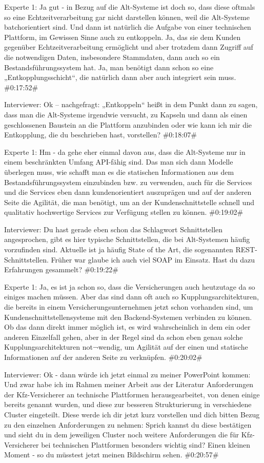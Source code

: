 Experte 1:
Ja gut - in Bezug auf die Alt-Systeme ist doch so, dass diese oftmals so eine Echtzeitverarbeitung gar nicht darstellen können, weil die Alt-Systeme batchorientiert sind. Und dann ist natürlich die Aufgabe von einer technischen Plattform, im Gewissen Sinne auch zu entkoppeln. Ja, das sie dem Kunden gegenüber Echtzeitverarbeitung ermöglicht und aber trotzdem dann Zugriff auf die notwendigen Daten, insbesondere Stammdaten, dann auch so ein Bestandsführungssystem hat. Ja, man benötigt dann schon so eine „Entkopplungsschicht“, die natürlich dann aber auch integriert sein muss.
\#0:17:52\#

Interviewer:
Ok – nachgefragt: „Entkoppeln“ heißt in dem Punkt dann zu sagen, dass man die Alt-Systeme irgendwie versucht, zu Kapseln und dann als einen geschlossenen Baustein an die Plattform anzubinden oder wie kann ich mir die Entkopplung, die du beschrieben hast, vorstellen?
\#0:18:07\#

Experte 1:
Hm - da gehe eher einmal davon aus, dass die Alt-Systeme nur in einem beschränkten Umfang API-fähig sind. Das man sich dann Modelle überlegen muss, wie schafft man es die statischen Informationen aus dem Bestandsführungssystem einzubinden bzw. zu verwenden, auch für die Services und die Services eben dann kundenorientiert auszuprägen und auf der anderen Seite die Agilität, die man benötigt, um an der Kundenschnittstelle schnell und qualitativ hochwertige Services zur Verfügung stellen zu können.
\#0:19:02\#

Interviewer:
Du hast gerade eben schon das Schlagwort Schnittstellen angesprochen, gibt es hier typische Schnittstellen, die bei Alt-Systemen häufig vorzufinden sind. Aktuelle ist ja häufig State of the Art, die sogenannten REST-Schnittstellen. Früher war glaube ich auch viel SOAP im Einsatz. Hast du dazu Erfahrungen gesammelt?
\#0:19:22\#

Experte 1:
Ja, es ist ja schon so, dass die Versicherungen auch heutzutage da so einiges machen müssen. Aber das sind dann oft auch so Kupplungsarchitekturen, die bereits in einem Versicherungsunternehmen jetzt schon vorhanden sind, um Kundenschnittstellensysteme mit den Backend-Systemen verbinden zu können. Ob das dann direkt immer möglich ist, es wird wahrscheinlich in dem ein oder anderen Einzelfall gehen, aber in der Regel sind da schon eben genau solche Kupplungsarchitekturen not¬wendig, um Agilität auf der einen und statische Informationen auf der anderen Seite zu verknüpfen.
\#0:20:02\#

Interviewer:
Ok - dann würde ich jetzt einmal zu meiner PowerPoint kommen: Und zwar habe ich im Rahmen meiner Arbeit aus der Literatur Anforderungen der Kfz-Versicherer an technische Plattformen herausgearbeitet, von denen einige bereits genannt wurden, und diese zur besseren Strukturierung in verschiedene Cluster eingeteilt. Diese werde ich dir jetzt kurz vorstellen und dich bitten Bezug zu den einzelnen Anforderungen zu nehmen: Sprich kannst du diese bestätigen und sieht du in dem jeweiligen Cluster noch weitere Anforderungen die für Kfz-Versicherer bei technischen Plattformen besonders wichtig sind? Einen kleinen Moment - so du müsstest jetzt meinen Bildschirm sehen.
\#0:20:57\#

